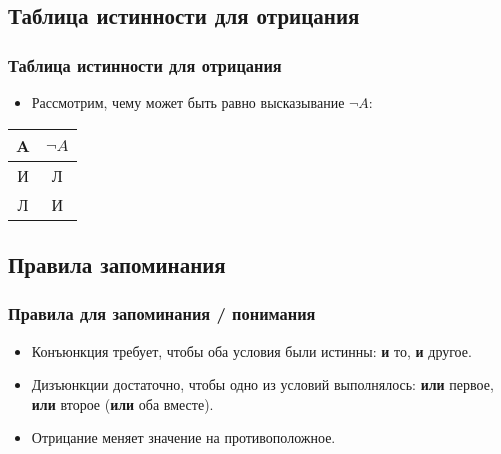 \documentclass[compress,red]{beamer}
\begin{document}
\subsection{Таблица истинности для отрицания}
\begin{frame}[fragile]
  \frametitle{Таблица истинности для отрицания}
  \begin{itemize}
    \item Рассмотрим, чему может быть равно высказывание ${\neg} A$:
  \end{itemize}
  \begin{center}
    \begin{tabular}{|c|c|}
      \hline
      A & ${\neg} A$ \\
      \hline
      И & Л \\
      \hline
      Л & И \\
      \hline
    \end{tabular}
  \end{center}
\end{frame}

\subsection{Правила запоминания}
\begin{frame}[fragile]
  \frametitle{Правила для запоминания / понимания}
  \begin{itemize}
    \item Конъюнкция требует, чтобы оба условия были истинны: \textbf{и} то, \textbf{и} другое.
    \item Дизъюнкции достаточно, чтобы одно из условий выполнялось: \textbf{или} первое, \textbf{или} второе (\textbf{или} оба вместе).
    \item Отрицание меняет значение на противоположное.
  \end{itemize}
\end{frame}
\end{document}
